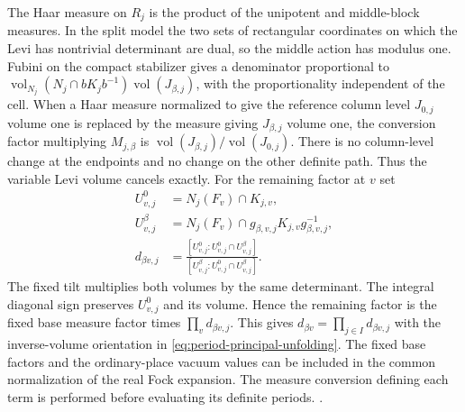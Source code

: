 The Haar measure on \(R_j\) is the product of the unipotent
and middle-block measures. In the split model the two sets of
rectangular coordinates on which the Levi has nontrivial
determinant are dual, so the middle action has modulus one.
Fubini on the compact stabilizer gives a denominator proportional
to \(\operatorname{vol}_{N_j}(N_j\cap bK_jb^{-1})
\operatorname{vol}(J_{\beta,j})\), with the proportionality
independent of the cell. When a Haar measure normalized to give
the reference column level \(J_{0,j}\) volume one is replaced by
the measure giving \(J_{\beta,j}\) volume one, the conversion
factor multiplying \(M_{j,\beta}\) is
\(\operatorname{vol}(J_{\beta,j})/\operatorname{vol}(J_{0,j})\).
There is no column-level change at the endpoints and no change
on the other definite path. Thus the variable Levi volume
cancels exactly. For the remaining factor at \(v\) set
\[
 \begin{split}
 U^0_{v,j}&=N_j(F_v)\cap K_{j,v},\\
 U^\beta_{v,j}&=N_j(F_v)\cap
                 g_{\beta,v,j}K_{j,v}g_{\beta,v,j}^{-1},\\
 d_{\beta v,j}
   &=\frac{[U^0_{v,j}:U^0_{v,j}\cap U^\beta_{v,j}]}
           {[U^\beta_{v,j}:U^0_{v,j}\cap U^\beta_{v,j}]}.
 \end{split}
\]
The fixed tilt multiplies both volumes by the same determinant.
The integral diagonal sign preserves \(U^0_{v,j}\) and its
volume. Hence the remaining factor is the fixed base measure
factor times \(\prod_v d_{\beta v,j}\). This gives
\(d_{\beta v}=\prod_{j\in I}d_{\beta v,j}\) with the inverse-volume
orientation in \eqref{eq:period-principal-unfolding}.
The fixed base factors and the ordinary-place vacuum values can
be included in the common normalization of the real Fock
expansion. The measure conversion defining each term is performed
before evaluating its definite periods.
.

